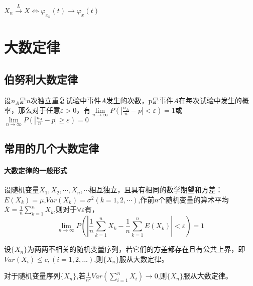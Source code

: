 \begin{theorem}[判断弱收敛]
    $X_n \xrightarrow{L} X \Leftrightarrow \varphi_{x_n}(t) \rightarrow \varphi_x(t) $
\end{theorem}

\section{大数定律}
\subsection{伯努利大数定律}
\begin{definition}
    设$n_A$是$n$次独立重复试验中事件$A$发生的次数，p是事件$A$在每次试验中发生的概率，那么对于任意$\varepsilon > 0$，有$\mathop {\lim }\limits_{n \to \infty } P\left( {\left| {\frac{{{n_A}}}{n} - p} \right| < \varepsilon } \right)=1$或$\mathop {\lim }\limits_{n \to \infty } P\left( {\left| {\frac{{{n_A}}}{n} - p} \right| \ge \varepsilon } \right)=0$
\end{definition}

\subsection{常用的几个大数定律}
\paragraph{大数定律的一般形式}
设随机变量${X_1},{X_2}, \cdots ,{X_n}, \cdots $相互独立，且具有相同的数学期望和方差：$E({X_k}) = \mu $,$Var({X_k}) = {\sigma ^2}(k = 1,2, \cdots )$,作前$n$个随机变量的算术平均$\bar X = \frac{1}{n}\sum\limits_{k = 1}^n {{X_k}} $,则对于$\forall \varepsilon$有，$$\mathop {\lim }\limits_{n \to \infty } P( |\frac{1}{n}\sum\limits_{k = 1}^n {{X_k}}  - \frac{1}{n}\sum\limits_{k = 1}^n {E({X_k})} | < \varepsilon )  = 1$$


\begin{theorem}[切比雪夫大数定律]
    设$\{X_n\}$为两两不相关的随机变量序列，若它们的方差都存在且有公共上界，即$Var({X_i}) \leqslant c,(i = 1,2,...)$,则$\{X_n\}$服从大数定律。
\end{theorem}

\begin{theorem}[马尔可夫大数定律]
    对于随机变量序列$\{X_n\}$,若$\frac{1}{{{n^2}}}Var(\sum\limits_{i = 1}^n {{X_i}} ) \to 0$,则$\{X_n\}$服从大数定律。

\end{theorem}

